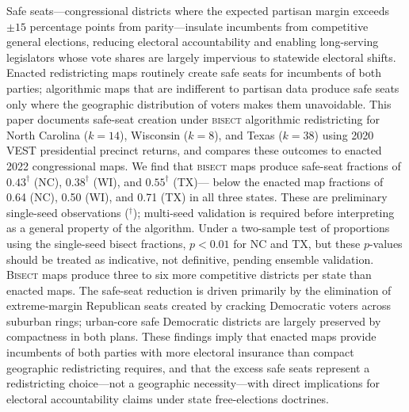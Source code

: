 Safe seats---congressional districts where the expected partisan margin exceeds $\pm15$
percentage points from parity---insulate incumbents from competitive general elections,
reducing electoral accountability and enabling long-serving legislators whose vote shares
are largely impervious to statewide electoral shifts. Enacted redistricting maps routinely
create safe seats for incumbents of both parties; algorithmic maps that are indifferent
to partisan data produce safe seats only where the geographic distribution of voters makes
them unavoidable. This paper documents safe-seat creation under \textsc{bisect}
algorithmic redistricting for North Carolina ($k=14$), Wisconsin ($k=8$), and Texas
($k=38$) using 2020 VEST presidential precinct returns, and compares these outcomes to
enacted 2022 congressional maps. We find that \textsc{bisect} maps produce safe-seat
fractions of $0.43^\dagger$ (NC), $0.38^\dagger$ (WI), and $0.55^\dagger$ (TX)---
below the enacted map fractions of 0.64 (NC), 0.50 (WI), and 0.71 (TX)
in all three states. These are preliminary single-seed observations ($^\dagger$);
multi-seed validation is required before interpreting as a general property of the algorithm.
Under a two-sample test of proportions using the single-seed bisect fractions, $p < 0.01$
for NC and TX, but these $p$-values should be treated as indicative, not definitive,
pending ensemble validation.
\textsc{Bisect} maps produce three to six more competitive districts per state than
enacted maps. The safe-seat reduction is driven primarily by the elimination of
extreme-margin Republican seats created by cracking Democratic voters across suburban
rings; urban-core safe Democratic districts are largely preserved by compactness in both
plans. These findings imply that enacted maps provide incumbents of both parties with
more electoral insurance than compact geographic redistricting requires, and that the
excess safe seats represent a redistricting choice---not a geographic necessity---with
direct implications for electoral accountability claims under state free-elections
doctrines.
